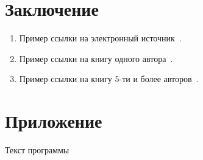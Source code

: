 \documentclass[14pt, oneside]{altsu-report}
\begin{document}




\chapter*{Заключение}

\begin{enumerate}
\item Пример ссылки на электронный источник~\cite{wikiRUArkanoid,wikiRUQtDocumentation,wikiRUHabr}.
\item Пример ссылки на книгу одного автора~\cite{book1author}.
\item Пример ссылки на книгу 5-ти и более авторов~\cite{book5author}.
\end{enumerate}

\newpage
{}
\printbibliography[title={Список использованной литературы}]

\appendix
\newpage
\chapter*{\raggedleft\label{appendix1}Приложение}

\begin{center}
\label{code:appendix}Текст программы
\end{center}

\begin{code}
\vspace{-1cm}\inputminted{C}{src/pi-mpi.c}
\end{code}
\end{document}
